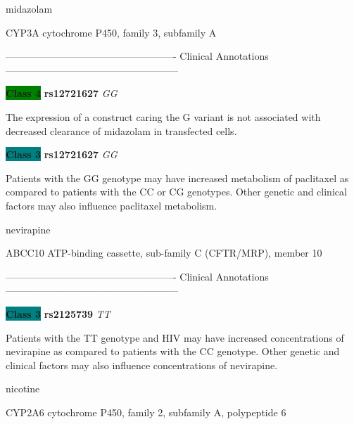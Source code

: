\documentclass{resume} %
\begin{document}
\begin{rSection}{ midazolam }
\begin{rSubsection}{ CYP3A }{ cytochrome P450, family 3, subfamily A }{}{}
\item[] ---------------------------------------------------- Clinical Annotations -----------------------------------------------------\newline
\item \textbf{\colorbox{green} {Class 4}} \textbf{ rs12721627 } \textit{ GG }
\item[] The expression of a construct caring the G variant is not associated with decreased clearance of midazolam in transfected cells.\item \textbf{\colorbox{teal} {Class 3}} \textbf{ rs12721627 } \textit{ GG }
\item[] Patients with the GG genotype may have increased metabolism of paclitaxel as compared to patients with the CC or CG genotypes. Other genetic and clinical factors may also influence paclitaxel metabolism.
\end{rSubsection}

\end{rSection}\begin{rSection}{ nevirapine }
\item[]

\begin{rSubsection}{ ABCC10 }{ ATP-binding cassette, sub-family C (CFTR/MRP), member 10 }{}{}
\item[]

\item[] ---------------------------------------------------- Clinical Annotations -----------------------------------------------------\newline
\item \textbf{\colorbox{teal} {Class 3}} \textbf{ rs2125739 } \textit{ TT }
\item[] Patients with the TT genotype and HIV may have increased concentrations of nevirapine as compared to patients with the CC genotype. Other genetic and clinical factors may also influence concentrations of nevirapine.
\end{rSubsection}

\end{rSection}\begin{rSection}{ nicotine }
\item[]

\begin{rSubsection}{ CYP2A6 }{ cytochrome P450, family 2, subfamily A, polypeptide 6 }{}{}
\item[]


\end{rSubsection}
\end{rSection}
\end{document}
